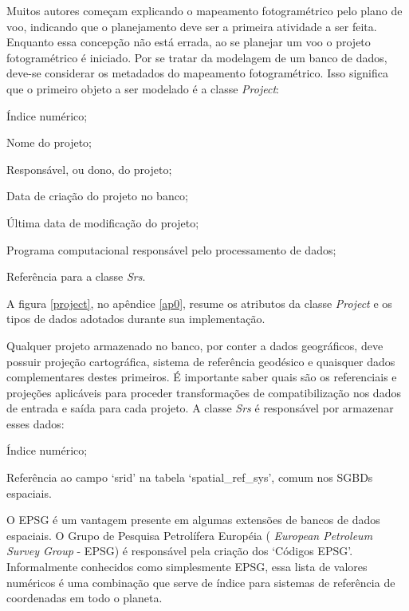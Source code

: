 Muitos autores começam explicando o mapeamento fotogramétrico pelo plano de voo, indicando que o planejamento deve ser a primeira atividade a ser feita. Enquanto essa concepção não está errada, ao se planejar um voo o projeto fotogramétrico é iniciado. Por se tratar da modelagem de um banco de dados, deve-se considerar os metadados do mapeamento fotogramétrico. Isso significa que o primeiro objeto a ser modelado é a classe \textit{Project}:

\begin{description}[labelwidth=2cm, itemsep=-0.3cm]
    \item [Classe Project]
    \item [Id:] Índice numérico;
    \item [Name:] Nome do projeto;
    \item [Owner:] Responsável, ou dono, do projeto;
    \item [Date\_add:] Data de criação do projeto no banco;
    \item [Date\_mod:] Última data de modificação do projeto;
    \item [Software:] Programa computacional responsável pelo processamento de dados;
    \item [Id\_srs:] Referência para a classe \textit{Srs}.
\end{description}

A figura \ref{project}, no apêndice \ref{ap0}, resume os atributos da classe \textit{Project} e os tipos de dados adotados durante sua implementação.

Qualquer projeto armazenado no banco, por conter a dados geográficos, deve possuir projeção cartográfica, sistema de referência geodésico e quaisquer dados complementares destes primeiros. É importante saber quais são os referenciais e projeções aplicáveis para proceder transformações de compatibilização nos dados de entrada e saída para cada projeto. A classe \textit{Srs} é responsável por armazenar esses dados:

\begin{description}[labelwidth=2cm, itemsep=-0.3cm]
\item [Classe Srs]
\item [Id:] Índice numérico;
\item [Epsg:] Referência ao  campo `srid' na tabela `spatial\_ref\_sys', comum nos SGBDs espaciais.
\end{description}

O EPSG é um vantagem presente em algumas extensões de bancos de dados espaciais. O Grupo de Pesquisa Petrolífera Européia ( \textit{European Petroleum Survey Group} - EPSG) é responsável pela criação dos `Códigos EPSG'. Informalmente conhecidos como simplesmente EPSG, essa lista de valores numéricos é uma combinação que serve de índice para sistemas de referência de coordenadas em todo o planeta.

